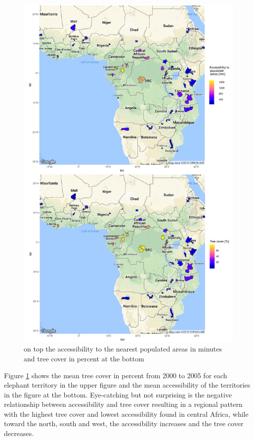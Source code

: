 \begin{center}
	\begin{figure}[H]
		\begin{center}
			\includegraphics[width=14cm]{images/sample_session_1-cropped.pdf}
			\caption{on top the accessibility to the nearest populated areas in minutes and tree cover in percent at the bottom}
			\label{sample_session_1}
		\end{center}
	\end{figure}
\end{center}


Figure \ref{sample_session_1} shows the mean tree cover in percent from 2000 to 2005 for each elephant territory in the upper figure and the mean accessibility of the territories in the figure at the bottom. Eye-catching but not surprising is the negative relationship between accessibility and tree cover resulting in a regional pattern with the highest tree cover and lowest accessibility found in central Africa, while toward the north, south and west, the accessibility increases and the tree cover decreases.

